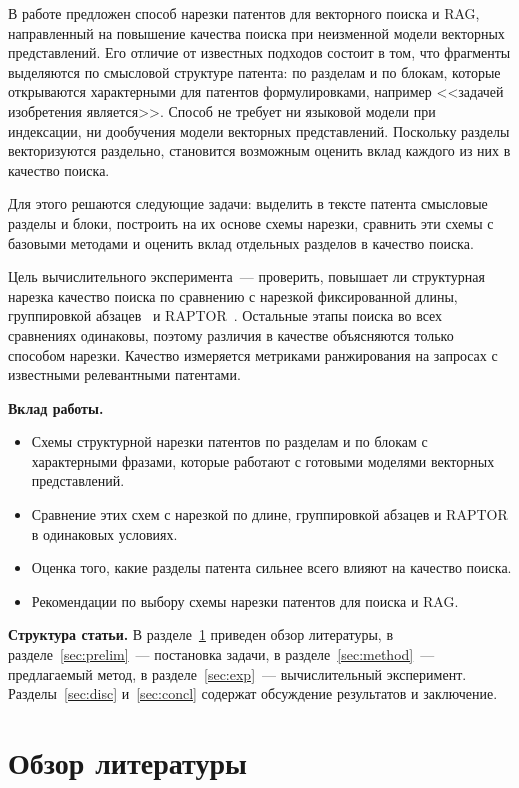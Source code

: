 \documentclass{article}
\begin{document}
В работе предложен способ нарезки патентов для векторного поиска и RAG, направленный на повышение качества поиска при неизменной модели векторных представлений. Его отличие от известных подходов состоит в том, что фрагменты выделяются по смысловой структуре патента: по разделам и по блокам, которые открываются характерными для патентов формулировками, например <<задачей изобретения является>>. Способ не требует ни языковой модели при индексации, ни дообучения модели векторных представлений. Поскольку разделы векторизуются раздельно, становится возможным оценить вклад каждого из них в качество поиска.

Для этого решаются следующие задачи: выделить в тексте патента смысловые разделы и блоки, построить на их основе схемы нарезки, сравнить эти схемы с базовыми методами и оценить вклад отдельных разделов в качество поиска.

Цель вычислительного эксперимента~--- проверить, повышает ли структурная нарезка качество поиска по сравнению с нарезкой фиксированной длины, группировкой абзацев~\citep{shaukat2026chunking} и RAPTOR~\citep{sarthi2024raptor}. Остальные этапы поиска во всех сравнениях одинаковы, поэтому различия в качестве объясняются только способом нарезки. Качество измеряется метриками ранжирования на запросах с известными релевантными патентами.

\textbf{Вклад работы.}
\begin{itemize}
    \item Схемы структурной нарезки патентов по разделам и по блокам с характерными фразами, которые работают с готовыми моделями векторных представлений.
    \item Сравнение этих схем с нарезкой по длине, группировкой абзацев и RAPTOR в одинаковых условиях.
    \item Оценка того, какие разделы патента сильнее всего влияют на качество поиска.
    \item Рекомендации по выбору схемы нарезки патентов для поиска и RAG.
\end{itemize}

\textbf{Структура статьи.} В разделе~\ref{sec:rw} приведен обзор литературы, в разделе~\ref{sec:prelim}~--- постановка задачи, в разделе~\ref{sec:method}~--- предлагаемый метод, в разделе~\ref{sec:exp}~--- вычислительный эксперимент. Разделы~\ref{sec:disc} и~\ref{sec:concl} содержат обсуждение результатов и заключение.

\section{Обзор литературы}\label{sec:rw}
\end{document}
